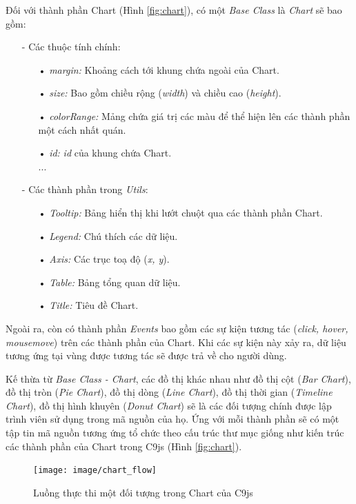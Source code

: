 \documentclass[12pt,a4paper]{article}
\begin{document}
Đối với thành phần Chart (Hình \ref{fig:chart}), có một \textit{Base Class} là \textit{Chart} sẽ bao gồm:
\begin{itemize}
\item[-] Các thuộc tính chính:
\begin{itemize}
\item[•] \emph{margin:} Khoảng cách tới khung chứa ngoài của Chart.
\item[•] \emph{size:} Bao gồm chiều rộng (\textit{width}) và chiều cao (\textit{height}).
\item[•] \emph{colorRange:} Mảng chứa giá trị các màu để thể hiện lên các thành phần một cách nhất quán.
\item[•] \emph{id:} \textit{id} của khung chứa Chart.\\
...
\end{itemize}
\item[-] Các thành phần trong \textit{Utils}:
\begin{itemize}
\item[•] \emph{Tooltip:} Bảng hiển thị khi lướt chuột qua các thành phần Chart.
\item[•] \emph{Legend:} Chú thích các dữ liệu.
\item[•] \emph{Axis:} Các trục toạ độ (\textit{x, y}).
\item[•] \emph{Table:} Bảng tổng quan dữ liệu.
\item[•] \emph{Title:} Tiêu đề Chart.
\end{itemize}
\end{itemize}

Ngoài ra, còn có thành phần \textit{Events} bao gồm các sự kiện tương tác (\textit{click, hover, mousemove}) trên các thành phần của Chart. Khi các sự kiện này xảy ra, dữ liệu tương ứng tại vùng được tương tác sẽ được trả về cho người dùng.

Kế thừa từ \textit{Base Class - Chart}, các đồ thị khác nhau như đồ thị cột (\textit{Bar Chart}), đồ thị tròn (\textit{Pie Chart}), đồ thị dòng (\textit{Line Chart}), đồ thị thời gian (\textit{Timeline Chart}), đồ thị hình khuyên (\textit{Donut Chart}) sẽ là các đối tượng chính được lập trình viên sử dụng trong mã nguồn của họ. Ứng với mỗi thành phần sẽ có một tập tin mã nguồn tương ứng tổ chức theo cấu trúc thư mục giống như kiến trúc các thành phần của Chart trong C9js (Hình \ref{fig:chart}).

\begin{figure}[!h]
	\begin{center}
    \texttt{[image: image/chart\_flow]}
    \caption{Luồng thực thi một đối tượng trong Chart của C9js}
    \label{fig:chart_flow}
	\end{center}
\end{figure}
\end{document}
